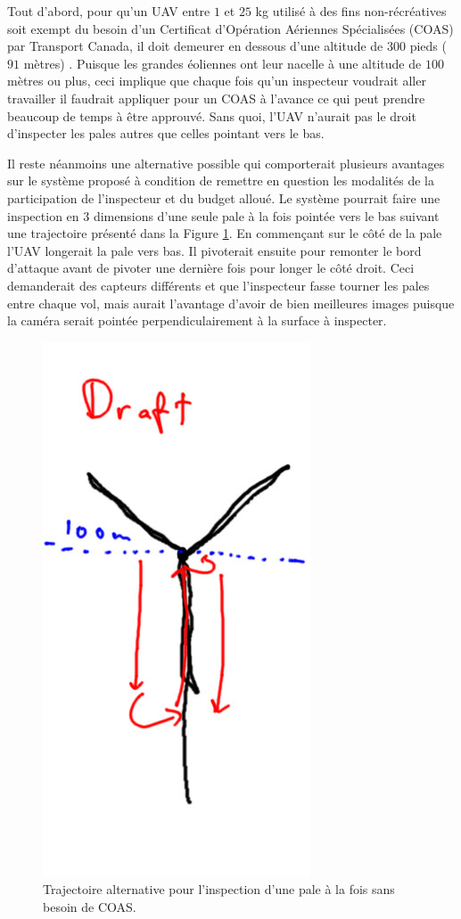 Tout d'abord, pour qu'un UAV entre $1$ et $25$ kg utilisé à des fins non-récréatives soit exempt du besoin d'un Certificat d'Opération Aériennes Spécialisées (COAS) par Transport Canada, il doit demeurer en dessous d'une altitude de $300$ pieds ($91$ mètres) \citep{transportscanada2016}. Puisque les grandes éoliennes ont leur nacelle à une altitude de $100$ mètres ou plus, ceci implique que chaque fois qu'un inspecteur voudrait aller travailler il faudrait appliquer pour un COAS à l'avance ce qui peut prendre beaucoup de temps à être approuvé. Sans quoi, l'UAV n'aurait pas le droit d'inspecter les pales autres que celles pointant vers le bas.

Il reste néanmoins une alternative possible qui comporterait plusieurs avantages sur le système proposé à condition de remettre en question les modalités de la participation de l'inspecteur et du budget alloué. Le système pourrait faire une inspection en 3 dimensions d'une seule pale à la fois pointée vers le bas suivant une trajectoire présenté dans la Figure \ref{fig:alternative}. En commençant sur le côté de la pale l'UAV longerait la pale vers bas. Il pivoterait ensuite pour remonter le bord d'attaque avant de pivoter une dernière fois pour longer le côté droit. Ceci demanderait des capteurs différents et que l'inspecteur fasse tourner les pales entre chaque vol, mais aurait l'avantage d'avoir de bien meilleures images puisque la caméra serait pointée perpendiculairement à la surface à inspecter.

\begin{figure}[htb]
  \centering
  \includegraphics[width=0.3\linewidth]{images/cool_alternative.jpg}
  \caption{Trajectoire alternative pour l'inspection d'une pale à la fois sans besoin de COAS.}
  \label{fig:alternative}
\end{figure}

